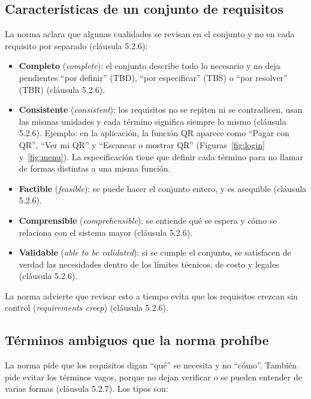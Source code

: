 \documentclass[11pt,a4paper]{article}
\begin{document}
\subsection{Características de un conjunto de requisitos}
La norma aclara que algunas cualidades se revisan en el conjunto y no en cada requisito por separado (cláusula 5.2.6):

\begin{itemize}
	\item \textbf{Completo} (\emph{complete}): el conjunto describe todo lo necesario y no deja pendientes “por definir” (TBD), “por especificar” (TBS) o “por resolver” (TBR) (cláusula 5.2.6).
	\item \textbf{Consistente} (\emph{consistent}): los requisitos no se repiten ni se contradicen, usan las mismas unidades y cada término significa siempre lo mismo (cláusula 5.2.6). Ejemplo: en la aplicación, la función QR aparece como “Pagar con QR”, “Ver mi QR” y “Escanear o mostrar QR” (Figuras~\ref{fig:login} y~\ref{fig:menu}). La especificación tiene que definir cada término para no llamar de formas distintas a una misma función.
	\item \textbf{Factible} (\emph{feasible}): se puede hacer el conjunto entero, y es asequible (cláusula 5.2.6).
	\item \textbf{Comprensible} (\emph{comprehensible}): se entiende qué se espera y cómo se relaciona con el sistema mayor (cláusula 5.2.6).
	\item \textbf{Validable} (\emph{able to be validated}): si se cumple el conjunto, se satisfacen de verdad las necesidades dentro de los límites técnicos, de costo y legales (cláusula 5.2.6).
\end{itemize}

La norma advierte que revisar esto a tiempo evita que los requisitos crezcan sin control (\emph{requirements creep}) (cláusula 5.2.6).

\subsection{Términos ambiguos que la norma prohíbe}
La norma pide que los requisitos digan “qué” se necesita y no “cómo”. También pide evitar los términos vagos, porque no dejan verificar o se pueden entender de varias formas (cláusula 5.2.7). Los tipos son:
\end{document}
